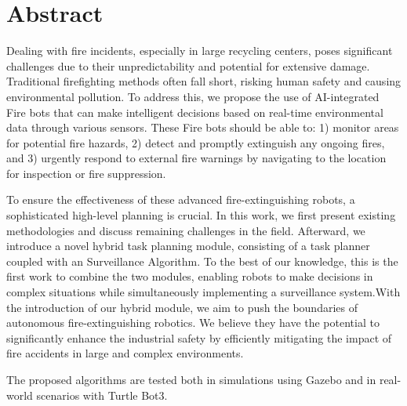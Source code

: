 \chapter*{Abstract}

Dealing with fire incidents, especially in large recycling centers, poses significant challenges due to their unpredictability and potential for extensive damage. Traditional firefighting methods often fall short, risking human safety and causing environmental pollution. To address this, we propose the use of AI-integrated Fire bots that can make intelligent decisions based on real-time environmental data through various sensors. These Fire bots should be able to: 1) monitor areas for potential fire hazards, 2) detect and promptly extinguish any ongoing fires, and 3) urgently respond to external fire warnings by navigating to the location for inspection or fire suppression.

To ensure the effectiveness of these advanced fire-extinguishing robots, a sophisticated high-level planning is crucial. In this work, we first present existing methodologies and discuss remaining challenges in the field. Afterward, we introduce a novel hybrid task planning module, consisting of a task planner coupled with an Surveillance Algorithm. To the best of our knowledge, this is the first work to combine the two modules, enabling robots to make decisions in complex situations while simultaneously implementing a surveillance system.With the introduction of our hybrid module, we aim to push the boundaries of autonomous fire-extinguishing robotics. We believe they have the potential to significantly enhance the industrial safety by efficiently mitigating the impact of fire accidents in large and complex environments.

The proposed algorithms are tested both in simulations using Gazebo and in real-world scenarios with Turtle Bot3.
